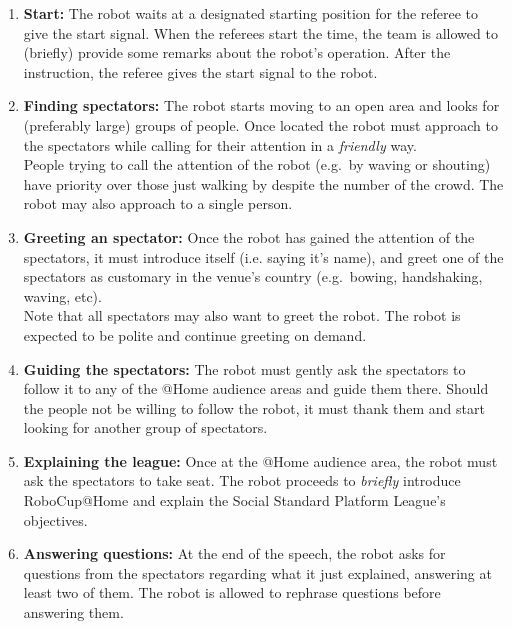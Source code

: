 \begin{enumerate}
	\item \textbf{Start:} The robot waits at a designated starting position for the referee to give the start signal. When the referees start the time, the team is allowed to (briefly) provide some remarks about the robot's operation. After the instruction, the referee gives the start signal to the robot.\\

	\item \textbf{Finding spectators:} The robot starts moving to an open area and looks for (preferably large) groups of people. Once located the robot must approach to the spectators while calling for their attention in a \emph{friendly} way.\\

	People trying to call the attention of the robot (e.g.~by waving or shouting) have priority over those just walking by despite the number of the crowd. The robot may also approach to a single person.\\

	\item \textbf{Greeting an spectator:} Once the robot has gained the attention of the spectators, it must introduce itself (i.e. saying it's name), and greet one of the spectators as customary in the venue's country (e.g.~bowing, handshaking, waving, etc).\\

	Note that all spectators may also want to greet the robot. The robot is expected to be polite and continue greeting on demand.\\

	\item \textbf{Guiding the spectators:} The robot must gently ask the spectators to follow it to any of the @Home audience areas and guide them there. Should the people not be willing to follow the robot, it must thank them and start looking for another group of spectators.\\

	\item \textbf{Explaining the league:} Once at the @Home audience area, the robot must ask the spectators to take seat. The robot proceeds to \textit{briefly} introduce RoboCup@Home and explain the Social Standard Platform League's objectives. \\

	\item \textbf{Answering questions:} At the end of the speech, the robot asks for questions from the spectators regarding what it just explained, answering at least two of them. The robot is allowed to rephrase questions before answering them.\\

\end{enumerate}


